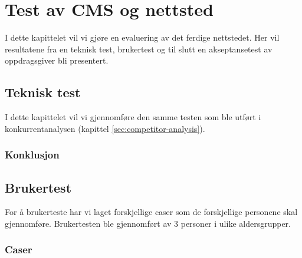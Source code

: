 \cleardoublepage
\chapter{Test av CMS og nettsted}
\label{chap:evaluation} 


I dette kapittelet vil vi gjøre en evaluering av det ferdige nettstedet. Her vil resultatene fra en teknisk test, brukertest og til slutt en akseptansetest av oppdragsgiver bli presentert.

\section{Teknisk test}
I dette kapittelet vil vi gjennomføre den samme testen som ble utført i konkurrentanalysen (kapittel \ref{sec:competitor-analysis}).

\subsection{Konklusjon}

\section{Brukertest}
For å brukerteste har vi laget forskjellige caser som de forskjellige personene skal gjennomføre. Brukertesten ble gjennomført av 3 personer i ulike aldersgrupper.

\subsection{Caser}

